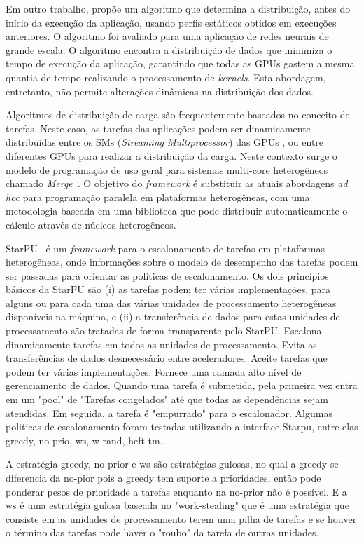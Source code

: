 Em outro trabalho, \cite{raphael} propõe um algoritmo que determina a
distribuição, antes do início da execução da aplicação, usando perfis estáticos
obtidos em execuções anteriores. O algoritmo foi avaliado para uma aplicação de
redes neurais de grande escala. O algoritmo encontra a distribuição de dados que
minimiza o tempo de execução da aplicação, garantindo que todas as GPUs gastem a
mesma quantia de tempo realizando o processamento de \emph{kernels}. Esta
abordagem, entretanto, não permite alterações dinâmicas na distribuição dos
dados.

Algoritmos de distribuição de carga são frequentemente baseados no conceito de
tarefas. Neste caso, as tarefas das aplicações podem ser dinamicamente
distribuídas entre os SMs (\textit{Streaming Multiprocessor}) das GPUs
\cite{dynamicLoad}, ou entre diferentes GPUs \cite{starpu} para realizar a
distribuição da carga. Neste contexto surge o modelo de programação de uso geral
para sistemas multi-core heterogêneos chamado \textit{Merge}~\cite{merge}. O
objetivo do \textit{framework} é substituir as atuais abordagens \textit{ad hoc}
para programação paralela em plataformas heterogêneas, com uma metodologia
baseada em uma biblioteca que pode distribuir automaticamente o cálculo através
de núcleos heterogêneos.

StarPU~\cite{starpu} é um \textit{framework} para o escalonamento de tarefas em
plataformas heterogêneas, onde informações sobre o modelo de desempenho das
tarefas podem ser passadas para orientar as políticas de escalonamento. Os dois
princípios básicos da StarPU são (i) as tarefas podem ter várias implementações,
para alguns ou para cada uma das várias unidades de processamento heterogêneas
disponíveis na máquina, e (ii) a transferência de dados para estas unidades de
processamento são tratadas de forma transparente pelo StarPU. Escalona dinamicamente
tarefas em todos as unidades de processamento. Evita as transferências de dados  desnecessário entre aceleradores. Aceite tarefas que podem ter várias implementações. Fornece uma camada alto nível de gerenciamento de dados. Quando uma tarefa é submetida, pela primeira vez entra em um "pool" de "Tarefas congelados" até que todas as dependências sejam atendidas. Em seguida, a tarefa é "empurrado" para o escalonador. Algumas politicas de escalonamento foram testadas utilizando a interface Starpu, entre elas greedy, no-prio, ws, w-rand, heft-tm. 

A estratégia greedy, no-prior e ws são estratégias gulosas, no qual  a greedy se diferencia da no-pior pois a greedy tem suporte a prioridades, então pode ponderar pesos de prioridade a tarefas enquanto na no-prior não é possível. E a ws é uma estratégia gulosa baseada no "work-stealing" que é uma estratégia que consiste em as unidades de processamento terem uma pilha de tarefas e se houver o término das tarefas pode haver o "roubo" da tarefa de outras unidades. 

